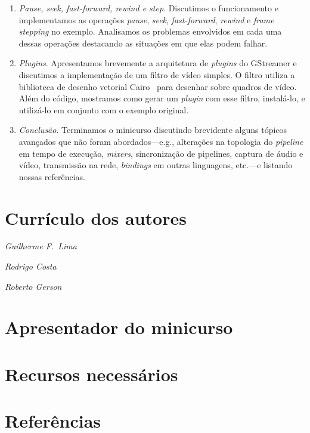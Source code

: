 \documentclass{SBCbookchapter}
\begin{document}
\begin{enumerate}
\item\emph{Pause, seek, fast-forward, rewind e step}.  Discutimos o
  funcionamento e implementamos as operações \emph{pause}, \emph{seek},
  \emph{fast-forward}, \emph{rewind} e \emph{frame stepping} no exemplo.
  Analisamos os problemas envolvidos em cada uma dessas operações destacando
  as situações em que elas podem falhar.

\item\emph{Plugins}.  Apresentamos brevemente a arquitetura de
  \emph{plugins} do GStreamer e discutimos a implementação de um filtro de
  vídeo simples.  O filtro utiliza a biblioteca de desenho vetorial
  Cairo~\cite{?} para desenhar sobre quadros de vídeo.  Além do código,
  mostramos como gerar um \emph{plugin} com esse filtro, instalá-lo, e
  utilizá-lo em conjunto com o exemplo original.

\item\emph{Conclusão}.  Terminamos o minicurso discutindo brevidente alguns
  tópicos avançados que não foram abordados---e.g., alterações na topologia
  do \emph{pipeline} em tempo de execução, \emph{mixers}, sincronização de
  pipelines, captura de áudio e vídeo, transmissão na rede, \emph{bindings}
  em outras linguagens, etc.---e listando nossas referências.
\end{enumerate}


\section{Currículo dos autores}

\noindent\emph{Guilherme F.~Lima}

\noindent\emph{Rodrigo Costa}

\noindent\emph{Roberto Gerson}


\section{Apresentador do minicurso}


\section{Recursos necessários}


\section*{Referências}
\end{document}
